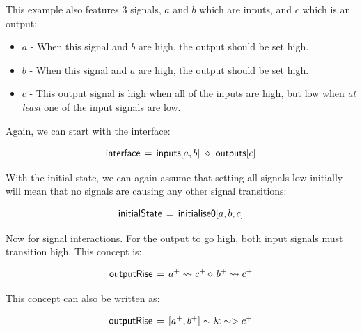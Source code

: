 \documentclass[british, journal]{IEEEtran}
\begin{document}
This example also features 3 signals, $a$ and $b$ which are inputs, and $c$
which is an output:

\begin{itemize}
  \item $a$ - When this signal and $b$ are high, the output should be set high.
  \item $b$ - When this signal and $a$ are high, the output should be set high.
  \item $c$ - This output signal is high when all of the inputs are high, but low when
		\emph{at least} one of the input signals are low.
\end{itemize}

\noindent Again, we can start with the interface: 

\vspace{-1mm}
\[
\begin{array}{lcl}
\mathsf{interface}&\hspace{-2mm}=&\hspace{-2mm}\mathsf{inputs}[a, b]~\diamond~\mathsf{outputs}[c]
\end{array}
\]

\noindent With the initial state, we can again assume that setting all signals low initially will mean 
that no signals are causing any other signal transitions:

\vspace{-2mm}
\[
\begin{array}{lcl}
\mathsf{initialState}&\hspace{-2mm}=&\hspace{-2mm}\mathsf{initialise0} [a, b, c]
\end{array}
\]

\noindent Now for signal interactions. For the output to go high, both input signals must
transition high. This concept is: 

\vspace{-1mm}
\[
\begin{array}{lcl}
\mathsf{outputRise}&\hspace{-2mm}=&\hspace{-2mm}a^{+} \rightsquigarrow c^{+} \diamond\, b^{+} \rightsquigarrow c^{+}
\end{array}
\]

\noindent This concept can also be written as:

\[
\begin{array}{lcl}
\mathsf{outputRise}&\hspace{-2mm}=&\hspace{-2mm}[a^{+}, b^{+}] \sim\&\sim> c^{+} 
\end{array}
\]
\end{document}
